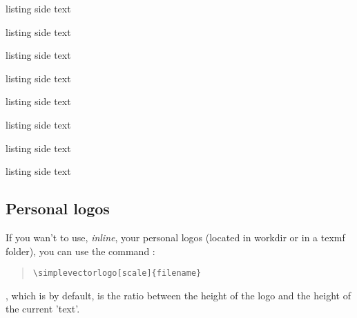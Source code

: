 \documentclass[11pt,a4paper]{ltxdoc}
\begin{document}
\begin{tcblisting}{listing side text}
\samplevectorlogo{\logoscratch}
\end{tcblisting}

\begin{tcblisting}{listing side text}
\samplevectorlogo{\logoscratch[alt]}
\end{tcblisting}

\begin{tcblisting}{listing side text}
\samplevectorlogo{\logoscratch[cat]}
\end{tcblisting}

\begin{tcblisting}{listing side text}
\samplevectorlogo{\logotexstudio}
\end{tcblisting}

\begin{tcblisting}{listing side text}
\samplevectorlogo{\logoemacs}
\end{tcblisting}

\begin{tcblisting}{listing side text}
\samplevectorlogo{\logoemacs[alt]}
\end{tcblisting}

\begin{tcblisting}{listing side text}
\samplevectorlogo{\logotexmaker}
\end{tcblisting}

\begin{tcblisting}{listing side text}
\samplevectorlogo{\logotexmaker[alt]}
\end{tcblisting}

\pagebreak

\subsection{Personal logos}

If you wan't to use, \textit{inline}, your personal logos (located in workdir or in a \textsf{texmf} folder), you can use the command :

\begin{quote}
\begin{verbatim}
\simplevectorlogo[scale]{filename}
\end{verbatim}
\end{quote}

\MontreCode{[scale]}, which is  by default, is the ratio between the height of the logo and the height of the current 'text'.
\end{document}
